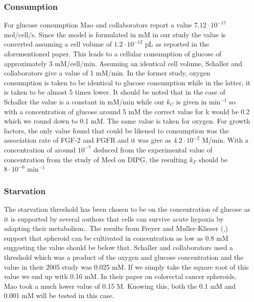 \documentclass[11pt,a4paper]{article}
\begin{document}
\subsubsection{Consumption}
For glucose consumption Mao and collaborators report a value $7.12 \cdot 10^{-17}$ mol/cell/s. Since the model is formulated in mM in our study the value is converted assuming a cell volume of $1.2 \cdot 10^{-12}$ pL as reported in the aforementioned paper. This leads to a cellular consumption of glucose of  approximately 3 mM/cell/min. Assuming an identical cell volume, Schaller and collaborators\cite{Kempf2005} give a value of 1 mM/min. In the former study, oxygen consumption is taken to be identical to glucose consumption while in the latter, it is taken to be almost 5  times lower.  It should be noted that in the case of Schaller the value is a constant in mM/min while our $k_C$ is given in min$^{-1}$ so with a concentration of glucose around 5 mM the correct value for k would be 0.2 which we round down to 0.1 mM. The same value is taken for oxygen. For growth factors, the only value found that could be likened to consumption was the association rate of FGF-2 and FGFR and it was give as $4.2 \cdot 10^{-2}$ \textmu M/min. With a concentration of around $10^{-7 }$ deduced from the experimental value of concentration from the study of Meel on DIPG, the resulting $k_F$ should be  $8 \cdot 10^{-6}$ min$^{-1}$

\subsubsection{Starvation}
The starvation threshold has been chosen to be on the concentration of glucose as it is supported by several authors that cells can survive acute hypoxia by adapting their metabolism.\cite{McKeown2014}\cite{Richards2016}. The results from Freyer and Muller-Klieser (\cite{MuellerKlieser1984},\cite{Freyer1986}) support that spheroid can be cultivated in concentration as low as 0.8 mM suggesting the value should be below that. Schaller and collaborators used a threshold which was a product of the oxygen and glucose concentration and the value in their 2005 study was 0.025 mM. If we simply take the square root of this value we end up with 0.16 mM.\cite{Kempf2005} In their paper on colorectal cancer spheroids, Mao took a much lower value of  0.15 \textmu M. \cite{Mao2018} Knowing this, both the 0.1 mM and 0.001 mM will be tested in this case.
\end{document}
